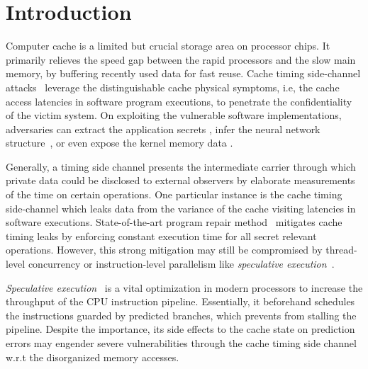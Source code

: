 \documentclass[sigconf, review]{acmart}
\begin{document}
\section{Introduction}
\label{sec:intro}
Computer cache is a limited but crucial storage area on processor chips. 
It primarily relieves the speed gap between the rapid processors and the 
slow main memory, by buffering recently used data for fast reuse. Cache 
timing side-channel attacks~\cite{Kocher96,DhemKLMQW98} leverage the 
distinguishable cache physical symptoms, i.e, the cache access latencies 
in software program executions, to penetrate the confidentiality of the 
victim system. On exploiting the vulnerable software implementations, 
adversaries can extract the application secrets
\cite{OsvikST06,TromerOS10,GullaschBK11,CGM16}, infer the neural network 
structure~\cite{YanFT18,HuLDLXJDLSX18,HongDKLRKDD18,DudduSRB18}, or even 
expose the kernel memory data
\cite{HundWH13,LippSGPHFHMKGYH18,KocherGGHHLMPSY19,WeisseVMGKPSSWY18}.


Generally, a timing side channel presents the intermediate carrier through 
which private data could be disclosed to external observers by elaborate
measurements of the time on certain operations. One particular instance is 
the cache timing side-channel which leaks data from the variance of the 
cache visiting latencies in software executions. State-of-the-art program 
repair method~\cite{WuGSW18} mitigates cache timing leaks by enforcing 
constant execution time for all secret relevant operations. However, this 
strong mitigation may still be compromised by thread-level concurrency
\cite{GuoWW18} or instruction-level parallelism like \textit{speculative 
execution}~\cite{kimuraKT1996}.


\textit{Speculative execution}~\cite{kimuraKT1996} is a vital optimization 
in modern processors to increase the throughput of the CPU instruction 
pipeline. Essentially, it beforehand schedules the instructions guarded by 
predicted branches, which prevents from stalling the pipeline. Despite the 
importance, its side effects to the cache state on prediction errors may 
engender severe vulnerabilities through the cache timing side channel
\cite{KocherGGHHLMPSY19,BulckMWGKPSWYS18,WeisseVMGKPSSWY18,IslamMBKGES19} 
w.r.t the disorganized memory accesses.
\end{document}
